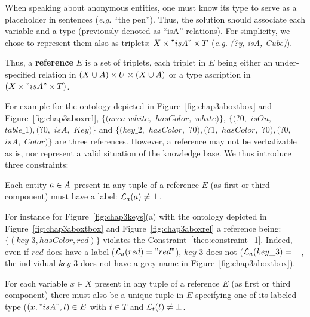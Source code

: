 \documentclass[a4paper,11pt,twoside]{StyleThese}
\begin{document}
When speaking about anonymous entities, one must know its type to serve as a placeholder in sentences (\textit{e.g.} ``the pen'').
Thus, the solution should associate each variable and a type (previously denoted as ``isA'' relations). For simplicity, we chose to represent them also as triplets: $X \times "isA" \times T$ (\textit{e.g.} \textit{(?y, isA, Cube)}). 

\begin{definition}[Reference]
\label{def:reference}
Thus, a \textbf{reference} $E$ is a set of triplets, each triplet in $E$ being either an under-specified relation in $(X \cup A) \times U \times (X \cup A)$ or a type ascription in  $(X \times "isA" \times T)$.
\end{definition}

For example for the ontology depicted in Figure~\ref{fig:chap3aboxtbox} and Figure~\ref{fig:chap3aboxrel}, $\{(area\_white,$ $hasColor,$ $white)\}$, $\{(?0,$ $isOn,$ $table\_1), (?0,$ $isA,$ $Key)\}$ and $\{(key\_2,$ $hasColor,$ $?0), (?1,$ $hasColor,$ $?0), (?0,$ $isA,$ $Color)\}$ are three references. However, a reference may not be verbalizable as is, nor represent a valid situation of the knowledge base. We thus introduce three constraints:

\begin{constraint}
\label{theo:constraint_1}
Each entity $a \in A$ present in any tuple of a reference $E$ (as first or third component) must have a label: $\mathcal{L}_a(a) \neq \bot$.
\end{constraint}

For instance for Figure~\ref{fig:chap3keys}(a) with the ontology depicted in Figure~\ref{fig:chap3aboxtbox} and Figure~\ref{fig:chap3aboxrel} a reference being: $\{(key\_3, hasColor, red)\}$ violates the Constraint~\ref{theo:constraint_1}. Indeed, even if $red$ does have a label ($\mathcal{L}_a(red) = "red"$), $key\_3$ does not ($\mathcal{L}_a(key\_3) = \bot$, the individual $key\_3$ does not have a grey name in Figure~\ref{fig:chap3aboxtbox}).

\begin{constraint}
\label{theo:constraint_2}
For each variable $x \in X$ present in any tuple of a reference $E$ (as first or third component) there must also be a unique tuple in $E$ specifying one of its labeled type ($(x, "isA", t) \in E$ with $t \in T$ and $\mathcal{L}_t(t) \neq \bot$.
\end{constraint}
\end{document}
